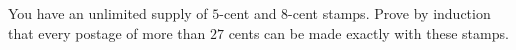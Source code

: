 You have an unlimited supply of $5$-cent and $8$-cent stamps. Prove by induction that every postage of more than $27$ cents can be made exactly with these stamps.
